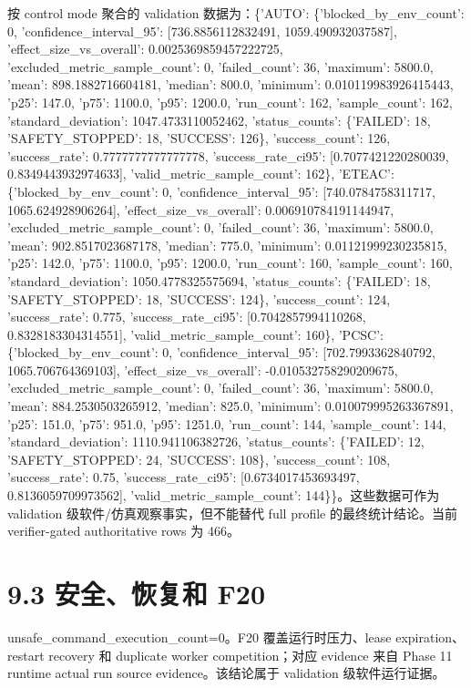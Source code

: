 按 control mode 聚合的 validation 数据为：\{'AUTO': \{'blocked\_by\_env\_count': 0, 'confidence\_interval\_95': [736.8856112832491, 1059.490932037587], 'effect\_size\_vs\_overall': 0.0025369859457222725, 'excluded\_metric\_sample\_count': 0, 'failed\_count': 36, 'maximum': 5800.0, 'mean': 898.1882716604181, 'median': 800.0, 'minimum': 0.010119983926415443, 'p25': 147.0, 'p75': 1100.0, 'p95': 1200.0, 'run\_count': 162, 'sample\_count': 162, 'standard\_deviation': 1047.4733110052462, 'status\_counts': \{'FAILED': 18, 'SAFETY\_STOPPED': 18, 'SUCCESS': 126\}, 'success\_count': 126, 'success\_rate': 0.7777777777777778, 'success\_rate\_ci95': [0.7077421220280039, 0.8349443932974633], 'valid\_metric\_sample\_count': 162\}, 'ETEAC': \{'blocked\_by\_env\_count': 0, 'confidence\_interval\_95': [740.0784758311717, 1065.624928906264], 'effect\_size\_vs\_overall': 0.006910784191144947, 'excluded\_metric\_sample\_count': 0, 'failed\_count': 36, 'maximum': 5800.0, 'mean': 902.8517023687178, 'median': 775.0, 'minimum': 0.01121999230235815, 'p25': 142.0, 'p75': 1100.0, 'p95': 1200.0, 'run\_count': 160, 'sample\_count': 160, 'standard\_deviation': 1050.4778325575694, 'status\_counts': \{'FAILED': 18, 'SAFETY\_STOPPED': 18, 'SUCCESS': 124\}, 'success\_count': 124, 'success\_rate': 0.775, 'success\_rate\_ci95': [0.7042857994110268, 0.8328183304314551], 'valid\_metric\_sample\_count': 160\}, 'PCSC': \{'blocked\_by\_env\_count': 0, 'confidence\_interval\_95': [702.7993362840792, 1065.706764369103], 'effect\_size\_vs\_overall': -0.010532758290209675, 'excluded\_metric\_sample\_count': 0, 'failed\_count': 36, 'maximum': 5800.0, 'mean': 884.2530503265912, 'median': 825.0, 'minimum': 0.010079995263367891, 'p25': 151.0, 'p75': 951.0, 'p95': 1251.0, 'run\_count': 144, 'sample\_count': 144, 'standard\_deviation': 1110.941106382726, 'status\_counts': \{'FAILED': 12, 'SAFETY\_STOPPED': 24, 'SUCCESS': 108\}, 'success\_count': 108, 'success\_rate': 0.75, 'success\_rate\_ci95': [0.6734017453693497, 0.8136059709973562], 'valid\_metric\_sample\_count': 144\}\}。这些数据可作为 validation 级软件/仿真观察事实，但不能替代 full profile 的最终统计结论。当前 verifier-gated authoritative rows 为 466。\par

\section{9.3 安全、恢复和 F20}

unsafe\_command\_execution\_count=0。F20 覆盖运行时压力、lease expiration、restart recovery 和 duplicate worker competition；对应 evidence 来自 Phase 11 runtime actual run source evidence。该结论属于 validation 级软件运行证据。\par

